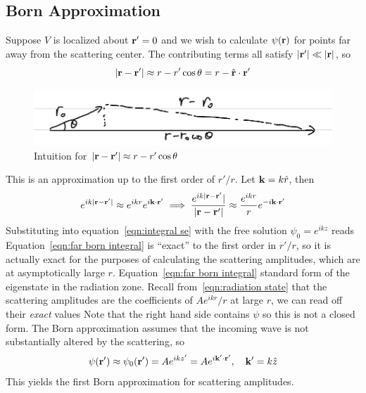 \subsection{Born Approximation}
Suppose $V$ is localized about $\mathbf r'=0$ 
and we wish to calculate $\psi(\mathbf r)$ for points far away from the scattering center. 
The contributing terms all satisfy $|\mathbf r'|\ll |\mathbf r|$, so 
\[ 
    |\mathbf r - \mathbf r'| \approx r - r'\cos\theta = r - \hat {\mathbf r} \cdot \mathbf r'
\] 
\begin{figure} %
    \centering
    \includegraphics[width=0.5\linewidth]{src/vector difference approx.jpeg}
    \caption{Intuition for $|\mathbf r - \mathbf r'|\approx r - r'\cos\theta$}
    \label{fig:vector difference approx}
\end{figure}
This is an approximation up to the first order of $r'/r$. 
Let $\mathbf k = k\hat r$, then 
\[ 
    e^{ik|\mathbf r - \mathbf r'|} \approx e^{ikr}e^{i\mathbf{k\cdot r'}} 
    \implies \dfrac{e^{ik|\mathbf{r - r'}}|}{|\mathbf{r-r'}|} \approx 
    \dfrac{e^{ikr}}{r}e^{-i\mathbf{k\cdot r'}} 
\] 
Substituting into equation~\ref{eqn:integral se} with the free 
solution $\psi_0=e^{ikz}$ reads 
Equation~\ref{eqn:far born integral} is ``exact'' to the first 
order in $r'/r$, so it is actually exact for the purposes of calculating the 
scattering amplitudes, which are at asymptotically large $r$. 
Equation~\ref{eqn:far born integral} 
standard form of the eigenstate in the radiation zone. 
Recall from~\ref{eqn:radiation state} that the scattering amplitudes 
are the coefficients of $Ae^{ikr}/r$ at large $r$, we 
can read off their \textit{exact} values 
Note that the right hand side contains $\psi$ so this is not a closed form. 
The Born approximation assumes that the incoming 
wave is not substantially altered by the scattering, 
so 
\[ 
    \psi(\mathbf r')\approx \psi_0(\mathbf r') = Ae^{ikz'} = Ae^{i\mathbf k'\cdot \mathbf r'}, \quad \mathbf k' = k\hat z 
\] 
This yields the first Born approximation for scattering amplitudes. 
